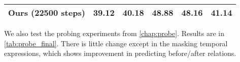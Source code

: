 \begin{table}[t]
\begin{tabular}{lccccc}
	\midrule
		\midrule
		Ours (22500 steps)			& 39.12 & 40.18 & 48.88 & 48.16 & 41.14 \\
        \bottomrule
	\end{tabular}
\end{table}


We also test the probing experiments from \cref{chap:probe}. Results are in
\cref{tab:probe_final}. There is little change except in the masking temporal
expressions, which shows improvement in predicting before/after relations.

